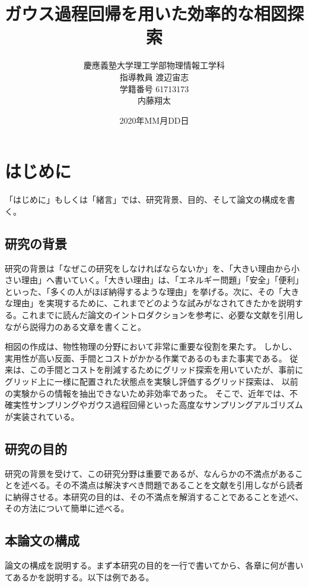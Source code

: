 \documentclass[titlepage]{jsreport}
\title{ガウス過程回帰を用いた効率的な相図探索}
\author{慶應義塾大学理工学部物理情報工学科\\
指導教員 渡辺宙志\\
学籍番号 61713173\\
内藤翔太}
\date{2020年MM月DD日}
\begin{document}
\maketitle

\tableofcontents

\chapter{はじめに} \label{chap:introduction}

「はじめに」もしくは「緒言」では、研究背景、目的、そして論文の構成を書く。

\section{研究の背景}

研究の背景は「なぜこの研究をしなければならないか」を、「大きい理由から小さい理由」へ書いていく。「大きい理由」は、「エネルギー問題」「安全」「便利」といった、「多くの人がほぼ納得するような理由」を挙げる。次に、その「大きな理由」を実現するために、これまでどのような試みがなされてきたかを説明する。これまでに読んだ論文のイントロダクションを参考に、必要な文献を引用しながら説得力のある文章を書くこと。

相図の作成は、物性物理の分野において非常に重要な役割を果たす。
しかし、実用性が高い反面、手間とコストがかかる作業であるのもまた事実である。
従来は、この手間とコストを削減するためにグリッド探索\cite{grid1,grid2}を用いていたが、事前にグリッド上に一様に配置された状態点を実験し評価するグリッド探索は、
以前の実験からの情報を抽出できないため非効率であった。
そこで、近年では、不確実性サンプリング\cite{uncertainty-sampling1,uncertainty-sampling2}やガウス過程回帰\cite{gaussian-phase}といった高度なサンプリングアルゴリズムが実装されている。
\section{研究の目的}

研究の背景を受けて、この研究分野は重要であるが、なんらかの不満点があることを述べる。その不満点は解決すべき問題であることを文献を引用しながら読者に納得させる。本研究の目的は、その不満点を解消することであることを述べ、その方法について簡単に述べる。

\section{本論文の構成}

論文の構成を説明する。まず本研究の目的を一行で書いてから、各章に何が書いてあるかを説明する。以下は例である。
\end{document}
